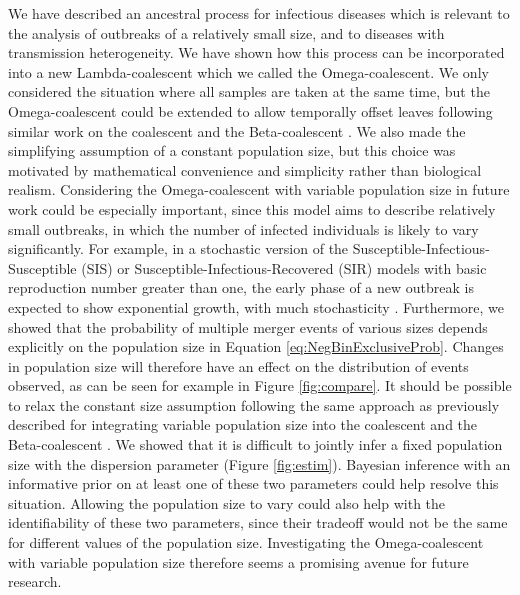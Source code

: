 \documentclass{article}
\renewcommand{\eqref}[1]{\ref{#1}}
\begin{document}
We have described an ancestral process for infectious diseases
which is relevant to the analysis of outbreaks of a relatively small size,
and to diseases with transmission heterogeneity.
We have shown how this process can be incorporated into a new Lambda-coalescent
which we called the Omega-coalescent. We only considered the
situation where all samples are taken at the same time, but
the Omega-coalescent could be extended to allow temporally offset leaves 
following similar work on the coalescent \citep{Drummond2003} and the Beta-coalescent \citep{Hoscheit2019}.
We also made the simplifying assumption of a constant population size,
but this choice was motivated by mathematical convenience and simplicity rather than 
biological realism. 
Considering the Omega-coalescent with variable population size in future work could be especially important,
since this model aims to describe relatively small outbreaks, in which the number of infected 
individuals is likely to vary significantly. 
For example, in a stochastic version of the 
Susceptible-Infectious-Susceptible (SIS) or Susceptible-Infectious-Recovered (SIR)
models with basic reproduction number greater than one,
the early phase of a new outbreak is expected to show exponential growth,
with much stochasticity \citep{Allen2008}.
Furthermore, 
we showed that the probability of multiple merger events of various sizes
depends explicitly on the population size in Equation \eqref{eq:NegBinExclusiveProb}.
Changes in population size will therefore have an effect on the distribution of
events observed, as can be seen for example in Figure \ref{fig:compare}.
It should be possible to relax the constant size assumption 
following the same approach as previously described for integrating variable population size into
the coalescent \citep{Griffiths1994,Pybus2000,Ho2011skylinereview} and the Beta-coalescent \citep{Hoscheit2019,zhangMultipleMergerCoalescent2024}.
We showed that it is difficult to jointly infer a fixed population size with the dispersion parameter 
(Figure \ref{fig:estim}). Bayesian inference with an informative prior on at least one of these two parameters
could help resolve this situation. Allowing the population size to vary could also help with
the identifiability of these two parameters, since their tradeoff would not be the same for different
values of the population size. Investigating the Omega-coalescent with variable population size
therefore seems a promising avenue for future research.
\end{document}

